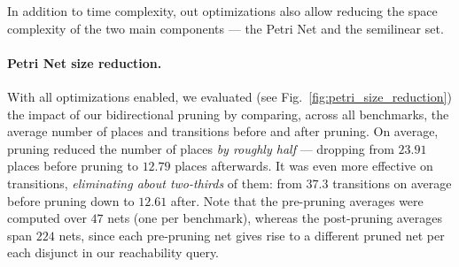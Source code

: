In addition to time complexity, out optimizations also allow reducing the space complexity of the two main components --- the Petri Net and the semilinear set.

\paragraph{Petri Net size reduction.}

With all optimizations enabled, we evaluated (see Fig.~\ref{fig:petri_size_reduction}) the impact of our bidirectional pruning by comparing, across all benchmarks, the average number of places and transitions before and after pruning. On average, pruning reduced the number of places \textit{by roughly half} --- dropping from $23.91$ places before pruning to $12.79$ places afterwards. It was even more effective on transitions, \textit{eliminating about two-thirds} of them: from $37.3$ transitions on average before pruning down to $12.61$ after. Note that the pre-pruning averages were computed over $47$ nets (one per benchmark), whereas the post-pruning averages span $224$ nets, since each pre-pruning net gives rise to a different pruned net per each disjunct in our reachability query. 









